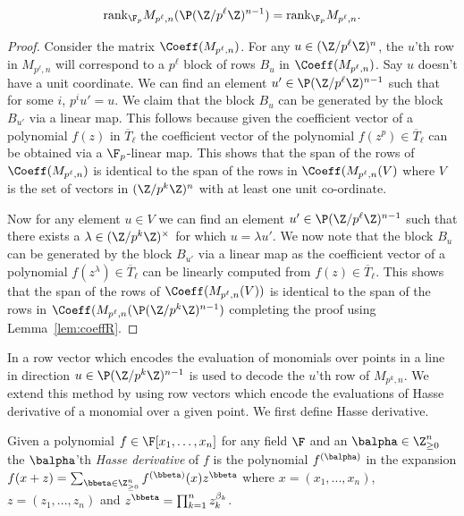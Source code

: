\begin{lem}\label{lem:resRk}
{\em $$\text{rank}_{\F_p} M_{p^\ell,n}(\P (\Z/p^\ell\Z)^{n-1}) = \text{rank}_{\F_p} M_{p^\ell,n}.$$}
\end{lem}
\begin{proof}
Consider the matrix $\Coeff(M_{p^\ell,n})$. For any $u\in (\Z/p^\ell\Z)^n$, the $u$'th row in $M_{p^\ell,n}$ will correspond to a $p^\ell$ block of rows $B_u$ in $\Coeff(M_{p^\ell,n})$. 
Say $u$ doesn't have a unit coordinate. We can find an element $u' \in \P (\Z/p^\ell \Z)^{n-1}$ such that for some $i$, $p^iu'=u$. We claim that the block $B_u$ can be generated by the block $B_{u'}$ via a linear map. This follows because given the coefficient vector of a polynomial $f(z)$ in $\overline{T}_{\ell}$ the coefficient vector of the polynomial $f(z^p)\in \overline{T}_\ell$ can be obtained via a $\F_p$-linear map. This shows that the span of the rows of $\Coeff(M_{p^\ell,n})$ is identical to the span of the rows in $\Coeff(M_{p^\ell,n}(V)$ where $V$ is the set of vectors in $(\Z/p^k\Z)^n$ with at least one unit co-ordinate.

Now for any element $u\in V$ we can find an element $u'\in \P (\Z/p^\ell \Z)^{n-1}$ such that there exists a $\lambda \in (\Z/p^k\Z)^\times$ for which $u=\lambda u'$. We now note that the block $B_u$ can be generated by the block $B_{u'}$ via a linear map as the coefficient vector of a polynomial $f(z^{\lambda})\in \overline{T}_{\ell}$ can be linearly computed from $f(z)\in \overline{T}_{\ell}$. This shows that the span of the rows of $\Coeff(M_{p^\ell,n}(V))$ is identical to the span of the rows in $\Coeff(M_{p^\ell,n}(\P (\Z/p^k\Z)^{n-1})$ completing the proof using Lemma~\ref{lem:coeffR}.
\end{proof}

In \cite{arsovski2021padic} a row vector which encodes the evaluation of monomials over points in a line in direction $u\in \P (\Z/p^k\Z)^{n-1}$ is used to decode the $u$'th row of $M_{p^k,n}$. We extend this method by using row vectors which encode the evaluations of Hasse derivative of a monomial over a given point. We first define Hasse derivative.

\begin{define}
Given a polynomial $f\in \F[x_1,\hdots,x_n]$ for any field $\F$ and an $\balpha\in \Z_{\ge 0}^n$ the $\balpha$'th {\em Hasse derivative} of $f$ is the polynomial $f^{(\balpha)}$ in the expansion $f(x+z)=\sum_{\bbeta\in \Z_{\ge 0}^n} f^{(\bbeta)}(x)z^{\bbeta}$ where $x=(x_1,...,x_n)$, $z=(z_1,...,z_n)$ and $z^{\bbeta}=\prod_{k=1}^n z_k^{\beta_k}$.  
\end{define}

